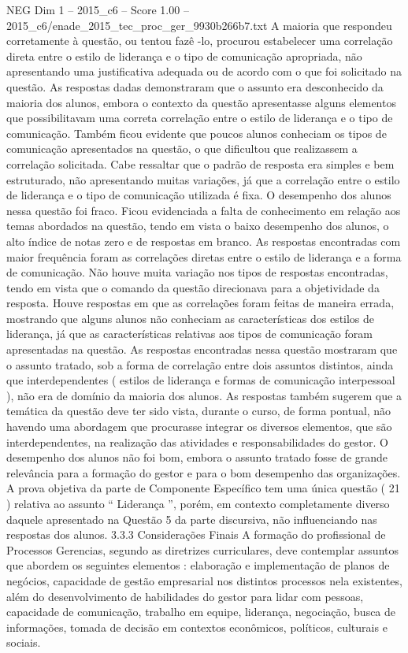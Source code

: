 \begin{textsample}{NEG Dim 1 – 2015\_c6 – Score 1.00 – 2015\_c6/enade\_2015\_tec\_proc\_ger\_9930b266b7.txt}
A maioria que respondeu corretamente à questão, ou tentou fazê -lo, procurou estabelecer uma correlação direta entre o estilo de liderança e o tipo de comunicação apropriada, não apresentando uma justificativa adequada ou de acordo com o que foi solicitado na questão.
As respostas dadas demonstraram que o assunto era desconhecido da maioria dos alunos, embora o contexto da questão apresentasse alguns elementos que possibilitavam uma correta correlação entre o estilo de liderança e o tipo de comunicação.
Também ficou evidente que poucos alunos conheciam os tipos de comunicação apresentados na questão, o que dificultou que realizassem a correlação solicitada.
Cabe ressaltar que o padrão de resposta era simples e bem estruturado, não apresentando muitas variações, já que a correlação entre o estilo de liderança e o tipo de comunicação utilizada é fixa.
O desempenho dos alunos nessa questão foi fraco.
Ficou evidenciada a falta de conhecimento em relação aos temas abordados na questão, tendo em vista o baixo desempenho dos alunos, o alto índice de notas zero e de respostas em branco.
As respostas encontradas com maior frequência foram as correlações diretas entre o estilo de liderança e a forma de comunicação.
Não houve muita variação nos tipos de respostas encontradas, tendo em vista que o comando da questão direcionava para a objetividade da resposta.
Houve respostas em que as correlações foram feitas de maneira errada, mostrando que alguns alunos não conheciam as características dos estilos de liderança, já que as características relativas aos tipos de comunicação foram apresentadas na questão.
As respostas encontradas nessa questão mostraram que o assunto tratado, sob a forma de correlação entre dois assuntos distintos, ainda que interdependentes ( estilos de liderança e formas de comunicação interpessoal ), não era de domínio da maioria dos alunos.
As respostas também sugerem que a temática da questão deve ter sido vista, durante o curso, de forma pontual, não havendo uma abordagem que procurasse integrar os diversos elementos, que são interdependentes, na realização das atividades e responsabilidades do gestor.
O desempenho dos alunos não foi bom, embora o assunto tratado fosse de grande relevância para a formação do gestor e para o bom desempenho das organizações.
A prova objetiva da parte de Componente Específico tem uma única questão ( 21 ) relativa ao assunto “ Liderança ”, porém, em contexto completamente diverso daquele apresentado na Questão 5 da parte discursiva, não influenciando nas respostas dos alunos. 3.3.3 Considerações Finais A formação do profissional de Processos Gerencias, segundo as diretrizes curriculares, deve contemplar assuntos que abordem os seguintes elementos : elaboração e implementação de planos de negócios, capacidade de gestão empresarial nos distintos processos nela existentes, além do desenvolvimento de habilidades do gestor para lidar com pessoas, capacidade de comunicação, trabalho em equipe, liderança, negociação, busca de informações, tomada de decisão em contextos econômicos, políticos, culturais e sociais.

\end{textsample}
